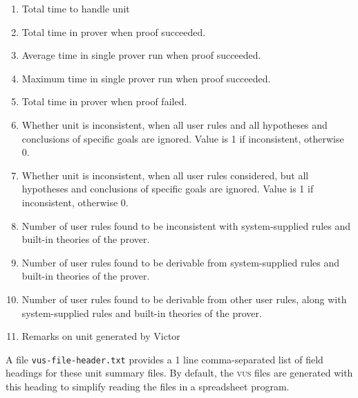 \documentclass[12pt,fleqn]{article}
\newcommand{\unitsumfile}{\textsc{vus}}
\begin{document}
\begin{enumerate}
\item Total time to handle unit
\item Total time in prover when proof succeeded.
\item Average time in single prover run when proof succeeded.
\item Maximum  time in single prover run when proof succeeded.
\item Total time in prover when proof failed.

\item Whether unit is inconsistent, when all user rules and all
  hypotheses and conclusions of specific goals are ignored.  Value is
  1 if inconsistent, otherwise 0.
\item Whether unit is inconsistent, when all user rules considered,
  but all hypotheses and conclusions of specific goals are ignored.
  Value is 1 if inconsistent, otherwise 0.
\item Number of user rules found to be inconsistent with system-supplied rules
  and built-in theories of the prover. 
\item Number of user rules found to be derivable from system-supplied rules
  and built-in theories of the prover. 
\item Number of user rules found to be derivable from other user
  rules, along with system-supplied rules and built-in theories of
  the prover.

\item Remarks on unit generated by Victor
\end{enumerate}
A file \texttt{vus-file-header.txt} provides a 1 line comma-separated
list of field headings for these unit summary files.  By default, the
\unitsumfile{} files are generated with this heading to simplify
reading the files in a spreadsheet program.


\end{document}
